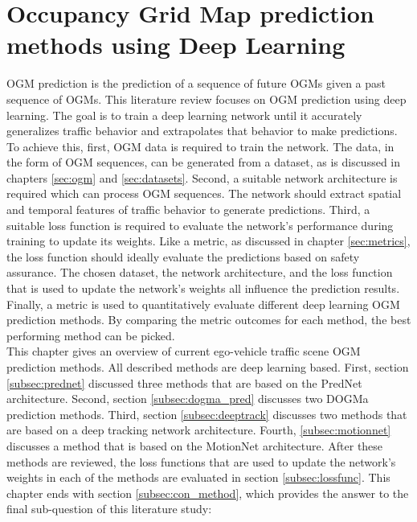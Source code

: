 \section{Occupancy Grid Map prediction methods using Deep Learning} \label{sec:ogm_methods}
\gls{OGM} prediction is the prediction of a sequence of future \glspl{OGM} given a past sequence of \glspl{OGM}. This literature review focuses on \gls{OGM} prediction using deep learning. The goal is to train a deep learning network until it accurately generalizes traffic behavior and extrapolates that behavior to make predictions. To achieve this, first, \gls{OGM} data is required to train the network. The data, in the form of \gls{OGM} sequences, can be generated from a dataset, as is discussed in chapters \ref{sec:ogm} and \ref{sec:datasets}. Second, a suitable network architecture is required which can process \gls{OGM} sequences. The network should extract spatial and temporal features of traffic behavior to generate predictions. Third, a suitable loss function is required to evaluate the network's performance during training to update its weights. Like a metric, as discussed in chapter \ref{sec:metrics}, the loss function should ideally evaluate the predictions based on safety assurance. The chosen dataset, the network architecture, and the loss function that is used to update the network's weights all influence the prediction results. Finally, a metric is used to quantitatively evaluate different deep learning \gls{OGM} prediction methods. By comparing the metric outcomes for each method, the best performing method can be picked.  \\

This chapter gives an overview of current ego-vehicle traffic scene \gls{OGM} prediction methods. All described methods are deep learning based. First, section \ref{subsec:prednet} discussed three methods that are based on the PredNet \cite{lotter2016deep} architecture. Second, section \ref{subsec:dogma_pred} discusses two \gls{DOGMa} prediction methods. Third, section \ref{subsec:deeptrack} discusses two methods that are based on a deep tracking network architecture. Fourth, \ref{subsec:motionnet} discusses a method that is based on the MotionNet \cite{wu2020motionnet} architecture. After these methods are reviewed, the loss functions that are used to update the network's weights in each of the methods are evaluated in section \ref{subsec:lossfunc}. This chapter ends with section \ref{subsec:con_method}, which provides the answer to the final sub-question of this literature study: 


